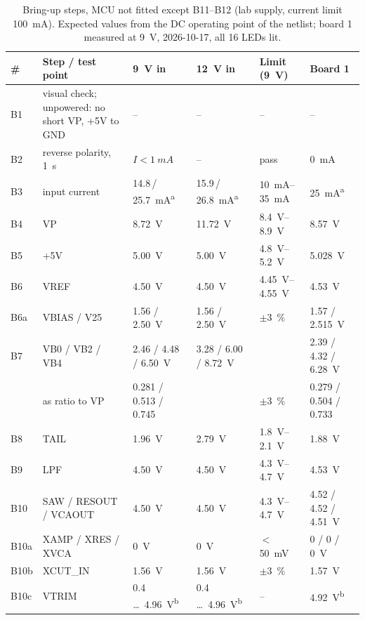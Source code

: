 \documentclass[11pt,a4paper]{article}
\begin{document}
\begin{table}[h]
\centering\small
\caption{Bring-up steps, MCU not fitted except B11--B12 (lab supply, current limit \SI{100}{mA}).
Expected values from the DC operating point of the netlist; board 1 measured at \SI{9}{V}, 2026-10-17, all
16 LEDs lit.}\label{tab:bringup}
\footnotesize\setlength{\tabcolsep}{4pt}
\begin{tabularx}{\textwidth}{@{}l >{\raggedright\arraybackslash}X l l l l@{}}
\toprule
\# & Step / test point & \SI{9}{V} in & \SI{12}{V} in & Limit (\SI{9}{V}) & Board 1 \\
\midrule
B1 & visual check; unpowered: no short VP, +5V to GND & -- & -- & -- & -- \\
B2 & reverse polarity, \SI{1}{s} & $I < \SI{1}{mA}$ & -- & pass & \SI{0}{mA} \\
B3 & input current & 14.8\,/\,\SI{25.7}{mA}\textsuperscript{a} & 15.9\,/\,\SI{26.8}{mA}\textsuperscript{a}
  & \SIrange{10}{35}{mA} & \SI{25}{mA}\textsuperscript{a} \\
B4 & VP & \SI{8.72}{V} & \SI{11.72}{V} & \SIrange{8.4}{8.9}{V} & \SI{8.57}{V} \\
B5 & +5V & \SI{5.00}{V} & \SI{5.00}{V} & \SIrange{4.8}{5.2}{V} & \SI{5.028}{V} \\
B6 & VREF & \SI{4.50}{V} & \SI{4.50}{V} & \SIrange{4.45}{4.55}{V} & \SI{4.53}{V} \\
B6a & VBIAS / V25 & 1.56 / \SI{2.50}{V} & 1.56 / \SI{2.50}{V} & $\pm$\SI{3}{\percent} & 1.57 / \SI{2.515}{V} \\
B7 & VB0 / VB2 / VB4 & 2.46 / 4.48 / \SI{6.50}{V} & 3.28 / 6.00 / \SI{8.72}{V} & & 2.39 / 4.32 / \SI{6.28}{V} \\
 & \quad as ratio to VP & 0.281 / 0.513 / 0.745 & & $\pm$\SI{3}{\percent} & 0.279 / 0.504 / 0.733 \\
B8 & TAIL & \SI{1.96}{V} & \SI{2.79}{V} & \SIrange{1.8}{2.1}{V} & \SI{1.88}{V} \\
B9 & LPF & \SI{4.50}{V} & \SI{4.50}{V} & \SIrange{4.3}{4.7}{V} & \SI{4.53}{V} \\
B10 & SAW / RESOUT / VCAOUT & \SI{4.50}{V} & \SI{4.50}{V} & \SIrange{4.3}{4.7}{V} & 4.52 / 4.52 / \SI{4.51}{V} \\
B10a & XAMP / XRES / XVCA & \SI{0}{V} & \SI{0}{V} & $<$ \SI{50}{mV} & 0 / 0 / \SI{0}{V} \\
B10b & XCUT\_IN & \SI{1.56}{V} & \SI{1.56}{V} & $\pm$\SI{3}{\percent} & \SI{1.57}{V} \\
B10c & VTRIM & 0.4 \ldots\ \SI{4.96}{V}\textsuperscript{b} & 0.4 \ldots\ \SI{4.96}{V}\textsuperscript{b} & -- & \SI{4.92}{V}\textsuperscript{b} \\

\end{tabularx}
\end{table}
\end{document}
